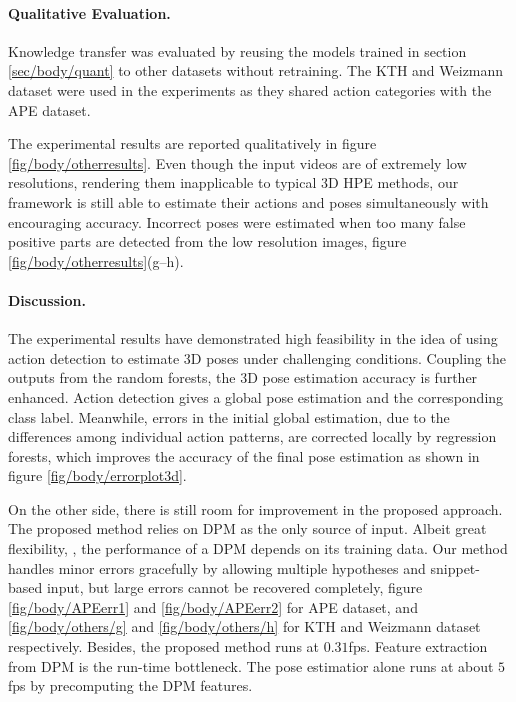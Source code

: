 

\paragraph{Qualitative Evaluation.}
Knowledge transfer was evaluated by reusing the models trained in section \ref{sec/body/quant} to other datasets without retraining.
The KTH \cite{Schuldt2004} and Weizmann \cite{Gorelick2007} dataset were used in the experiments as they shared action categories with the APE dataset. 

The experimental results are reported qualitatively in figure \ref{fig/body/otherresults}. Even though the input videos are of extremely low resolutions, rendering them inapplicable to typical 3D HPE methods, our framework is still able to estimate their actions and poses simultaneously with encouraging accuracy. 
Incorrect poses were estimated when too many false positive parts are detected from the low resolution images, \eg figure \ref{fig/body/otherresults}(g--h). 

\paragraph{Discussion.}
The experimental results have demonstrated high feasibility in the idea of using action detection to estimate 3D poses under challenging conditions.  
Coupling the outputs from the random forests, the 3D pose estimation accuracy is further enhanced. Action detection gives a global pose estimation and the corresponding class label. Meanwhile, errors in the initial global estimation, due to the differences among individual action patterns, are corrected locally by regression forests, which improves the accuracy of the final pose estimation as shown in figure \ref{fig/body/errorplot3d}. 

On the other side, there is still room for improvement in the proposed approach. The proposed method relies on DPM as the only source of input. Albeit great flexibility, \cf \cite{Yang2011}, the performance of a DPM depends on its training data. Our method handles minor errors gracefully by allowing multiple hypotheses and snippet-based input, but large errors cannot be recovered completely, \eg figure \ref{fig/body/APEerr1} and \ref{fig/body/APEerr2} for APE dataset, and \ref{fig/body/others/g} and \ref{fig/body/others/h} for KTH and Weizmann dataset respectively. 
Besides, the proposed method runs at $0.31$fps. Feature extraction from DPM is the run-time bottleneck. The pose estimatior alone runs at about $5$fps by precomputing the DPM features. 

